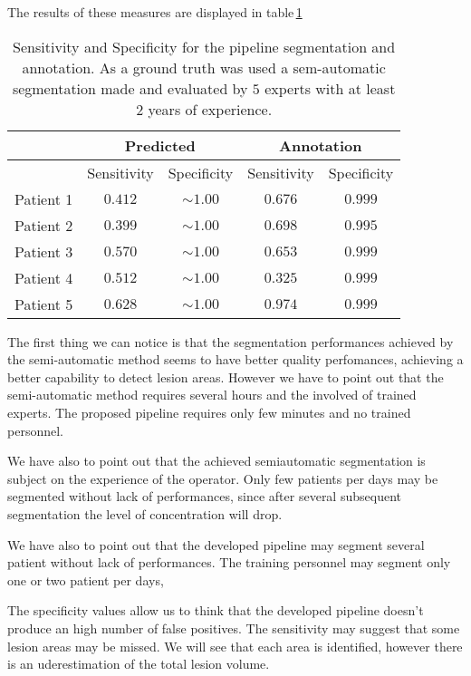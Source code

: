 \documentclass{standalone}
\begin{document}
	The results of these measures are displayed in table\,\ref{tab:Measures}
	\begin{table}[h!]
		\centering
		\begin{tabular}{|c|c|c|c|c|}
			\hline
			\multirow{2}{*}{}		  & \multicolumn{2}{c|}{Predicted} & \multicolumn{2}{c|}{Annotation} \\ \hline
						& Sensitivity & Specificity	 		& Sensitivity & Specificity		 \\ \hline
			Patient 1	& $0.412$	  &	$\sim 1.00$			&	$0.676$	  &	$ 0.999$ 		 \\ 
			Patient 2	& $0.399$	  & $\sim 1.00$ 		&	$0.698$	  & $ 0.995$		 \\
			Patient 3	& $0.570$	  &	$\sim 1.00$			&	$0.653$	  & $ 0.999$		 \\
			Patient 4	& $0.512$	  & $\sim 1.00$			&	$0.325$	  & $ 0.999$		 \\
			Patient 5 	& $0.628$	  & $\sim 1.00$			&	$0.974$	  &	$ 0.999$		 \\ \hline
		\end{tabular}\caption{Sensitivity and Specificity for the pipeline segmentation and annotation. As a ground truth was used a sem-automatic segmentation made and evaluated by $5$ experts with at least $2$ years of experience.}\label{tab:Measures}
		
	\end{table}
	
	
	The first thing we can notice is that the segmentation performances achieved by the semi-automatic method seems to have better quality perfomances, achieving a better capability to detect lesion areas. However we have to point out that the semi-automatic method requires several hours and the involved of trained experts. The proposed pipeline requires only few minutes and no trained personnel.
	
	We have also to point out that the achieved semiautomatic segmentation is subject on the experience of the operator. Only few patients per days may be segmented without lack of performances, since after several subsequent segmentation the level of concentration will drop.
	
	
	 
	We have also to point out that the developed pipeline may segment several patient without lack of performances. The training personnel may segment only one or two patient per days, 
	
	The specificity values allow us to think that the developed pipeline doesn't produce an high number of false positives. The  sensitivity may suggest that some lesion areas may be missed. We will see that each area is identified, however there is an uderestimation of the total lesion volume. 
	
\end{document}
